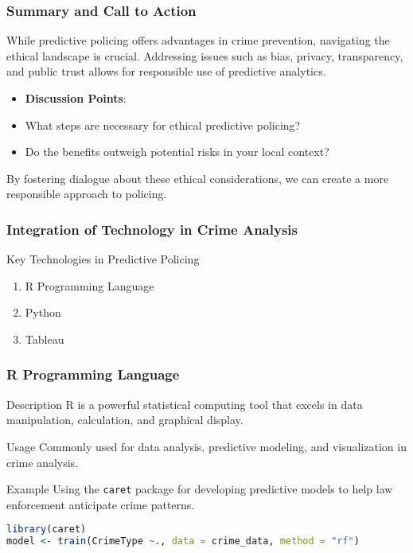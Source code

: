 \documentclass[aspectratio=169]{beamer}
\begin{document}
\begin{frame}[fragile]
    \frametitle{Summary and Call to Action}
    While predictive policing offers advantages in crime prevention, navigating the ethical landscape is crucial. Addressing issues such as bias, privacy, transparency, and public trust allows for responsible use of predictive analytics.
    \begin{itemize}
        \item \textbf{Discussion Points}:
            \item What steps are necessary for ethical predictive policing?
            \item Do the benefits outweigh potential risks in your local context?
    \end{itemize}
    By fostering dialogue about these ethical considerations, we can create a more responsible approach to policing.
\end{frame}

\begin{frame}[fragile]
    \frametitle{Integration of Technology in Crime Analysis}
    \begin{block}{Key Technologies in Predictive Policing}
        \begin{enumerate}
            \item R Programming Language
            \item Python
            \item Tableau
        \end{enumerate}
    \end{block}
\end{frame}

\begin{frame}[fragile]
    \frametitle{R Programming Language}
    \begin{block}{Description}
        R is a powerful statistical computing tool that excels in data manipulation, calculation, and graphical display.
    \end{block}
    \begin{block}{Usage}
        Commonly used for data analysis, predictive modeling, and visualization in crime analysis.
    \end{block}
    \begin{block}{Example}
        Using the \texttt{caret} package for developing predictive models to help law enforcement anticipate crime patterns.
    \end{block}
    \begin{lstlisting}[language=R]
library(caret)
model <- train(CrimeType ~., data = crime_data, method = "rf")
    \end{lstlisting}
\end{frame}
\end{document}
